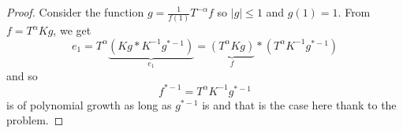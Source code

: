 \documentclass[12pt]{article}
\begin{document}
\begin{proof}
Consider the function $g = \frac{1}{f(1)} T^{-\alpha} f$ so $|g| \leq 1$ and $g(1) = 1$. From $f = T^{\alpha} K g$, we get
$$e_1 = T^{\alpha} \underbrace{(K g * K^{-1} g^{*-1})}_{e_1} = \underbrace{(T^{\alpha} Kg)}_{f} * (T^{\alpha} K^{-1}g^{*-1})$$
and so
$$f^{*-1} = T^{\alpha} K^{-1} g^{*-1}$$
is of polynomial growth as long as $g^{*-1}$ is and that is the case here thank to the problem.
\end{proof}

\unless\ifdefined\IsMainDocument
\end{document}
